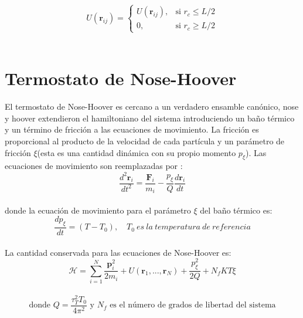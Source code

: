\begin{equation}\label{MIC}
    U(\mathbf{r}_{ij}) =
    \begin{cases} 
    U(\mathbf{r}_{ij}),& \text{si } r_c\leq L/2\\
    0,& \text{si } r_c\geq L/2
    \end{cases}
\end{equation}\\

\section{Termostato de Nose-Hoover}

El termostato de Nose-Hoover es cercano a un verdadero ensamble canónico, nose y hoover extendieron el hamiltoniano del sistema introduciendo un baño térmico y un término de fricción a las ecuaciones de movimiento. La fricción es proporcional al producto de la velocidad de cada partícula y un parámetro de fricción $\xi$(esta es una cantidad dinámica con su propio momento $p_\xi$). Las ecuaciones de movimiento son reemplazadas por \cite{evans1985} \cite{gromacsdoc}:\\

\begin{equation} \label{NHmotion}
    \frac{d^2\mathbf{r}_i}{dt^2} = \frac{\mathbf{F}_i}{m_i}-\frac{p_\xi}{Q}\frac{d\mathbf{r}_i}{dt}
\end{equation}\\

donde la ecuación de movimiento para el parámetro $\xi$ del baño térmico es:\\

\begin{equation}
    \frac{dp_\xi}{dt}=(T-T_0),\quad T_0\ es\ la\ temperatura\ de\ referencia
\end{equation}\\

La cantidad conservada para las ecuaciones de Nose-Hoover es:\\

\begin{equation} \label{conservedNoseHoover}
    \mathcal{H} = \sum_{i=1}^{N}\frac{\mathbf{p}_i^2}{2m_i} + U(\mathbf{r}_1,...,\mathbf{r}_N)+\frac{p_\xi^2}{2Q} + N_fKT\xi
\end{equation}\\

\begin{equation*} \label{taut}
    \text{donde }Q=\frac{\tau_T^2 T_0}{4\pi^2} \text{ y $N_f$ es el número de grados de libertad del sistema}
\end{equation*}\\

